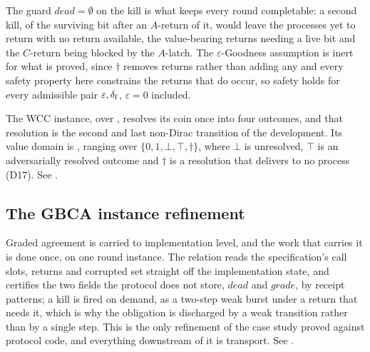 The guard $dead = \emptyset$ on the kill is what keeps every round completable: a second kill, of the surviving bit after an $A$-return of it, would leave the processes yet to return with no return available, the value-bearing returns needing a live bit and the $C$-return being blocked by the $A$-latch.
The $\varepsilon$-Goodness assumption is inert for what is proved, since $\dagger$ removes returns rather than adding any and every safety property here constrains the returns that do occur, so safety holds for every admissible pair $\varepsilon,\delta_{\mathrm{f}}$, $\varepsilon = 0$ included.




The WCC instance, over , resolves its coin once into four outcomes, and that resolution is the second and last non-Dirac transition of the development.
Its value domain is , ranging over $\{0,1,\bot,\top,\dagger\}$, where $\bot$ is unresolved, $\top$ is an adversarially resolved outcome and $\dagger$ is a resolution that delivers to no process (D17).
See .




\subsection{The GBCA instance refinement}

Graded agreement is carried to implementation level, and the work that carries it is done once, on one round instance.
The relation reads the specification's call slots, returns and corrupted set straight off the implementation state, and certifies the two fields the protocol does not store, $dead$ and $grade$, by receipt patterns; a kill is fired on demand, as a two-step weak burst under a return that needs it, which is why the obligation is discharged by a weak transition rather than by a single step.
This is the only refinement of the case study proved against protocol code, and everything downstream of it is transport.
See .

